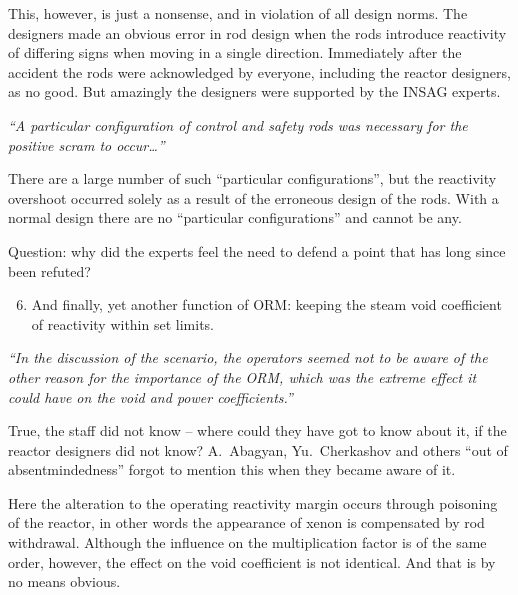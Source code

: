\documentclass[openright]{bookest}
\begin{document}
This, however, is just a nonsense, and in violation of all design norms. The designers made an obvious error in rod design when the rods introduce reactivity of differing signs when moving in a single direction. Immediately after the accident the rods were acknowledged by everyone, including the reactor designers, as no good. But amazingly the designers were supported by the INSAG experts.

\begin{personal}[INSAG-7 (§5.1):]
\textit{``A particular configuration of control and safety rods was necessary for the positive scram to occur\ldots{}''}
\end{personal}

There are a large number of such ``particular configurations'', but the reactivity overshoot occurred solely as a result of the erroneous design of the rods. With a normal design there are no ``particular configurations'' and cannot be any.

Question: why did the experts feel the need to defend a point that has long since been refuted?

\begin{enumerate}\setcounter{enumi}{5}
\item And finally, yet another function of ORM: keeping the steam void coefficient of reactivity within set limits.
\end{enumerate}

\begin{personal}[INSAG-7 (§4.2):]
\textit{``In the discussion of the scenario, the operators seemed not to be aware of the other reason for the importance of the ORM, which was the extreme effect it could have on the void and power coefficients.''}
\end{personal}

True, the staff did not know -- where could they have got to know about it, if the reactor designers did not know? A.~Abagyan, Yu.~Cherkashov and others ``out of absentmindedness'' forgot to mention this when they became aware of it.

Here the alteration to the operating reactivity margin occurs through poisoning of the reactor, in other words the appearance of xenon is compensated by rod withdrawal. Although the influence on the multiplication factor is of the same order, however, the effect on the void coefficient is not identical. And that is by no means obvious.
\end{document}
